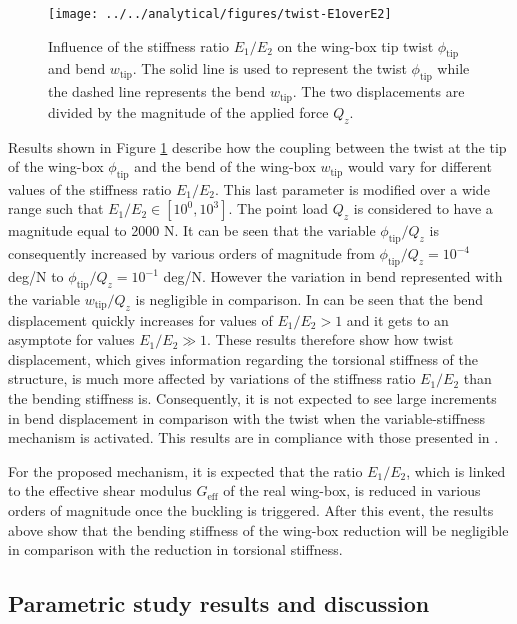     \begin{figure}[!htpb] %
      \centering
      \texttt{[image: ../../analytical/figures/twist-E1overE2]}
      \caption[Influence of the stiffness ratio on the wing-box tip twist and bend]{Influence of the stiffness ratio $E_1/E_2$ on the wing-box tip twist $\phi_{\mathrm{tip}}$ and bend $w_{\mathrm{tip}}$. The solid line is used to represent the twist $\phi_{\mathrm{tip}}$ while the dashed line represents the bend $w_{\mathrm{tip}}$. The two displacements are divided by the magnitude of the applied force $Q_z$.}\label{fig:twist-E1overE2}
    \end{figure}

    Results shown in Figure \ref{fig:twist-E1overE2} describe how the coupling between the twist at the tip of the wing-box $\phi_{\mathrm{tip}}$ and the bend of the wing-box $w_{\mathrm{tip}}$ would vary for different values of the stiffness ratio $E_1/E_2$. This last parameter is modified over a wide range such that $E_1/E_2 \in [10^{0}, 10^{3}]$. The point load $Q_z$ is considered to have a magnitude equal to 2000 N. It can be seen that the variable $\phi_{\mathrm{tip}}/Q_z$ is consequently increased by various orders of magnitude from $\phi_{\mathrm{tip}}/Q_z = 10^{-4}$ deg/N to $\phi_{\mathrm{tip}}/Q_z = 10^{-1}$ deg/N. However the variation in bend represented with the variable $w_{\mathrm{tip}}/Q_z$ is negligible in comparison. In can be seen that the bend displacement quickly increases for values of $E_1/E_2 > 1$ and it gets to an asymptote for values $E_1/E_2 \gg 1$. These results therefore show how twist displacement, which gives information regarding the torsional stiffness of the structure, is much more affected by variations of the stiffness ratio $E_1/E_2$ than the bending stiffness is. Consequently, it is not expected to see large increments in bend displacement in comparison with the twist when the variable-stiffness mechanism is activated. This results are in compliance with those presented in \cite{Raither2013a}.

    For the proposed mechanism, it is expected that the ratio $E_1/E_2$, which is linked to the effective shear modulus $G_{\mathrm{eff}}$ of the real wing-box, is reduced in various orders of magnitude once the buckling is triggered. After this event, the results above show that the bending stiffness of the wing-box reduction will be negligible in comparison with the reduction in torsional stiffness. 

  \clearpage
  \subsection{Parametric study results and discussion} \label{subsec:results_parametricStudy}

